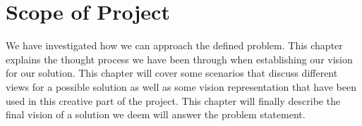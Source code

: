 
\chapter{Scope of Project}
\label{cha:scope_of_project}

We have investigated how we can approach the defined problem. This chapter explains the thought process we have been through when establishing our vision for our solution. This chapter will cover some scenarios that discuss different views for a possible solution as well as some vision representation that have been used in this creative part of the project. This chapter will finally describe the final vision of a solution we deem will answer the problem statement. 







